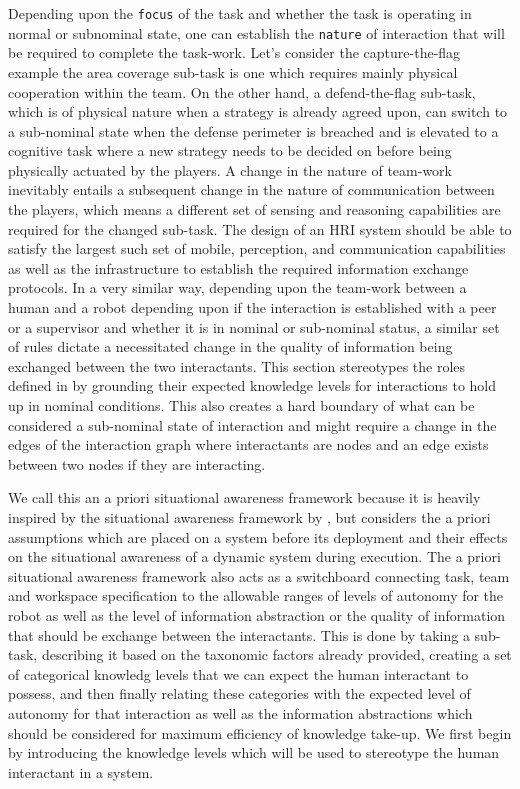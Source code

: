 \documentclass[letterpaper, 10 pt, conference]{ieeeconf} %
\begin{document}
Depending upon the \texttt{focus} of the task and whether the task is operating in normal or subnominal
state, one can establish the \texttt{nature} of interaction that will be required to complete the
task-work. Let's consider the capture-the-flag example the area coverage sub-task is one which
requires mainly physical cooperation within the team. On the other hand, a defend-the-flag sub-task,
which is of physical nature when a strategy is already agreed upon, can switch to a sub-nominal
state when the defense perimeter is breached and is elevated to a cognitive task where a new
strategy needs to be decided on before being physically actuated by the players. A change in the
nature of team-work inevitably entails a subsequent change in the nature of communication between
the players, which means a different set of sensing and reasoning capabilities are required for the
changed sub-task. The design of an HRI system should be able to satisfy the largest such set of
mobile, perception, and communication capabilities as well as the infrastructure to establish the
required information exchange protocols. In a very similar way, depending upon the team-work between
a human and a robot depending upon if the interaction is established with a peer or a supervisor and
whether it is in nominal or sub-nominal status, a similar set of rules dictate a necessitated change
in the quality of information being exchanged between the two interactants. This section stereotypes
the roles defined in \citet{Goodrich2007,Scholtz2003} by grounding their expected knowledge levels
for interactions to hold up in nominal conditions. This also creates a hard boundary of what can be
considered a sub-nominal state of interaction and might require a change in the edges of the
interaction graph where interactants are nodes and an edge exists between two nodes if they are
interacting.

We call this an a priori situational awareness framework because it is heavily inspired by the
situational awareness framework by \citet{Endsley1995}, but considers the a priori assumptions which
are placed on a system before its deployment and their effects on the situational awareness of a
dynamic system during execution. The a priori situational awareness framework also acts as a
switchboard connecting task, team and workspace specification to the allowable ranges of levels of
autonomy for the robot as well as the level of information abstraction or the quality of information
that should be exchange between the interactants. This is done by taking a sub-task, describing it
based on the taxonomic factors already provided, creating a set of categorical knowledg levels that
we can expect the human interactant to possess, and then finally relating these categories with the
expected level of autonomy for that interaction as well as the information abstractions which should
be considered for maximum efficiency of knowledge take-up. We first begin by introducing the
knowledge levels which will be used to stereotype the human interactant in a system.
\end{document}
